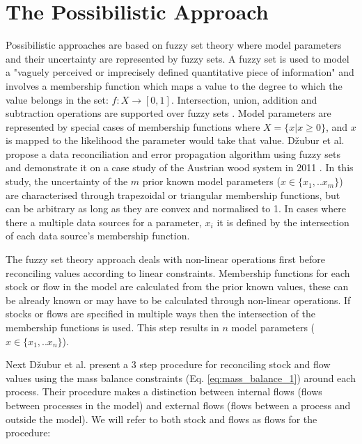 \documentclass[ %
                    author={Tom Jager},
                supervisor={Dr. Daniel Schien},
                    degree={MEng},
                     title={A Bayesian Inference Engine for UMIS Structured Data},
                  subtitle={},
                      type={research},
                      year={2019} ]{dissertation}
\begin{document}
\section{The Possibilistic Approach}
Possibilistic approaches are based on fuzzy set theory where model parameters and their uncertainty are represented by fuzzy sets. A fuzzy set is used to model a "vaguely perceived or imprecisely defined quantitative piece of information" \cite{dubois2000fuzzy} and involves a membership function which maps a value to the degree to which the value belongs in the set: $f: X \rightarrow{[0,1]}$. Intersection, union, addition and subtraction operations are supported over fuzzy sets \cite{viertl2006beschreibung}. Model parameters are represented by special cases of membership functions where $X = \{x | x \ge 0\}$, and $x$ is mapped to the likelihood the parameter would take that value. D\v{z}ubur et al. propose a data reconciliation and error propagation algorithm using fuzzy sets and demonstrate it on a case study of the Austrian wood system in 2011 \cite{dvzubur2017fuzzy}. In this study, the uncertainty of the $m$ prior known model parameters ($x \in \{x_1, .. x_m\}$) are characterised through trapezoidal or triangular membership functions, but can be arbitrary as long as they are convex and normalised to 1. In cases where there a multiple data sources for a parameter, $x_i$ it is defined by the intersection of each data source's membership function.

The fuzzy set theory approach deals with non-linear operations first before reconciling values according to linear constraints. Membership functions for each stock or flow in the model are calculated from the prior known values, these can be already known or may have to be calculated through non-linear operations. If stocks or flows are specified in multiple ways then the intersection of the membership functions is used. This step results in $n$ model parameters ($\hat{x} \in \{x_1, .. x_n\}$).

Next  D\v{z}ubur et al. present a 3 step procedure for reconciling stock and flow values using the mass balance constraints (Eq. \ref{eq:mass_balance_1}) around each process. Their procedure makes a distinction between internal flows (flows between processes in the model) and external flows (flows between a process and outside the model). We will refer to both stock and flows as flows for the procedure:
\end{document}
